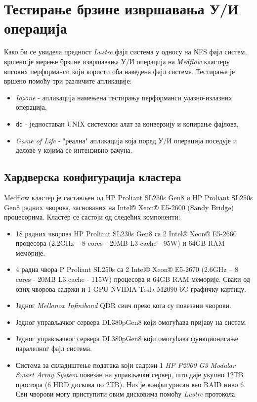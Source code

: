 \chapter{Тестирање брзине извршавања У/И операција}

Како би се увидела предност \textit{Lustre} фајл система у односу на NFS фајл систем, вршено је мерење брзине извршавања У/И операција на \textit{Мedflow} кластеру високих перформанси који користи оба наведена фајл система. Тестирање је вршено помоћу три различите апликације:


\begin{itemize}
\item \textit{Iozone} - апликација намењена тестирању перформанси улазно-излазних операција,
\item \texttt{dd} - једноставан UNIX системски алат за конверзију и копирање фајлова,
\item \textit{Game of Life} - "реална" апликација која поред У/И операција поседује и делове у којима се интензивно рачуна.
\end{itemize}

\section{Хардверска конфигурација кластера}

Medflow кластер је састављен од HP Proliant SL230s Gen8 и HP Proliant SL250s Gen8 радних чворова, заснованих на Intel® Xeon® E5-2600 (Sandy Bridge) процесорима. Кластер се састоји од следећих компоненти:

\begin{itemize}

\item 18 радних чворова HP Proliant SL230s Gen8 са 2 Intel® Xeon® E5-2660 процесора (2.2GHz – 8 cores - 20MB L3 cache - 95W) и  64GB RAM меморије.
\item 4 радна чвора P Proliant SL250s са 2 Intel® Xeon® E5-2670 (2.6GHz – 8 cores - 20MB L3 cache - 115W) процесора и  64GB RAM меморије. Сваки од ових чворова садржи и 1 GPU NVIDIA Tesla
M2090 6G графичку картицу.
\item Једног \textit{Mellanox Infiniband} QDR свич преко кога су повезани чворови.  
\item Једног управљачког сервера DL380pGen8 који омогућава пријаву на систем.
\item Једног управљачког сервера DL380pGen8 који омогућава функционисање паралелног фајл система.
\item Система за складиштење података који садржи 1 \textit{HP P2000 G3 Modular Smart Array System} повезан на управљачки сервер, што даје укупно 12TB простора (6 HDD дискова по 2TB). Низ је конфигурисан као RAID ниво 6. Сви чворови могу приступити овим дисковима помоћу \textit{Lustre} протокола.
\end{itemize}
 
